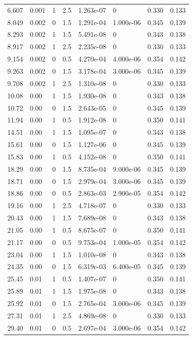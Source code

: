 \documentclass[preview]{standalone}
\begin{document}
{{\begin{tabular}{L{1.2cm}C{1.2cm} C{0.3cm}C{0.5cm} C{1.4cm}C{1.4cm} C{1.4cm}C{1.4cm}}
  6.607  &  0.001  & 1     & 2.5 &  1.263e-07  & 0  & 0.330 &  0.133   \\ 
  8.049  &  0.002  & 0     & 1.5 &  1.291e-04  & 1.000e-06  & 0.345 &  0.139   \\ 
  8.293  &  0.002  & 1     & 1.5 &  5.491e-08  & 0  & 0.343 &  0.138   \\ 
  8.917  &  0.002  & 1     & 2.5 &  2.235e-08  & 0  & 0.330 &  0.133   \\ 
  9.154  &  0.002  & 0     & 0.5 &  4.270e-04  & 4.000e-06  & 0.354 &  0.142   \\ 
  9.263  &  0.002  & 0     & 1.5 &  3.178e-04  & 3.000e-06  & 0.345 &  0.139   \\ 
  9.708  &  0.002  & 1     & 2.5 &  1.310e-08  & 0  & 0.330 &  0.133   \\ 
  10.08  &  0.00  & 1     & 1.5 &  1.930e-08  & 0  & 0.343 &  0.138   \\ 
  10.72  &  0.00  & 0     & 1.5 &  2.643e-05  & 0  & 0.345 &  0.139   \\ 
  11.94  &  0.00  & 1     & 0.5 &  1.912e-08  & 0  & 0.350 &  0.141   \\ 
  14.51  &  0.00  & 1     & 1.5 &  1.095e-07  & 0  & 0.343 &  0.138   \\ 
  15.61  &  0.00  & 0     & 1.5 &  1.127e-06  & 0  & 0.345 &  0.139   \\ 
  15.83  &  0.00  & 1     & 0.5 &  4.152e-08  & 0  & 0.350 &  0.141   \\ 
  18.29  &  0.00  & 0     & 1.5 &  8.735e-04  & 9.000e-06  & 0.345 &  0.139   \\ 
  18.71  &  0.00  & 0     & 1.5 &  2.979e-04  & 3.000e-06  & 0.345 &  0.139   \\ 
  18.86  &  0.00  & 0     & 0.5 &  2.863e-03  & 2.900e-05  & 0.354 &  0.142   \\ 
  19.16  &  0.00  & 1     & 2.5 &  4.718e-07  & 0  & 0.330 &  0.133   \\ 
  20.43  &  0.00  & 1     & 1.5 &  7.689e-08  & 0  & 0.343 &  0.138   \\ 
  21.05  &  0.00  & 1     & 0.5 &  8.675e-07  & 0  & 0.350 &  0.141   \\ 
  21.17  &  0.00  & 0     & 0.5 &  9.753e-04  & 1.000e-05  & 0.354 &  0.142   \\ 
  23.04  &  0.00  & 1     & 1.5 &  1.010e-08  & 0  & 0.343 &  0.138   \\ 
  24.35  &  0.00  & 0     & 1.5 &  6.319e-03  & 6.400e-05  & 0.345 &  0.139   \\ 
  25.45  &  0.01  & 1     & 0.5 &  1.407e-07  & 0  & 0.350 &  0.141   \\ 
  25.89  &  0.01  & 1     & 1.5 &  1.975e-08  & 0  & 0.343 &  0.138   \\ 
  25.92  &  0.01  & 0     & 1.5 &  2.765e-04  & 3.000e-06  & 0.345 &  0.139   \\ 
  27.31  &  0.01  & 1     & 2.5 &  4.869e-08  & 0  & 0.330 &  0.133   \\ 
  29.40  &  0.01  & 0     & 0.5 &  2.697e-04  & 3.000e-06  & 0.354 &  0.142   \\ 
\hline 
\end{tabular} 

}}
\end{document}
